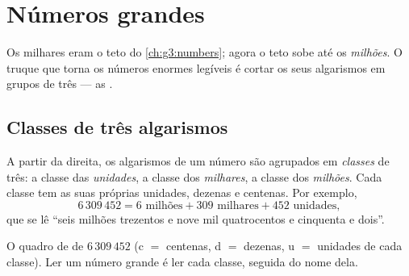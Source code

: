 \chapter{Números grandes}\label{ch:g4:numbers}

Os milhares eram o teto do \cref{ch:g3:numbers}; agora o teto sobe
até os \emph{milhões}. O truque que torna os números enormes legíveis
é cortar os seus algarismos em grupos de três --- as .

\section{Classes de três algarismos}

\begin{definition}[Classes]\label{def:g4:numbers:classes}
A partir da direita, os algarismos de um número são agrupados em
\emph{classes} de três: a classe das \emph{unidades}, a classe dos
\emph{milhares}, a classe dos \emph{milhões}. Cada classe tem as suas
próprias unidades, dezenas e centenas. Por exemplo,
\[
6\,309\,452 = 6 \text{ milhões} + 309 \text{ milhares}
+ 452 \text{ unidades},
\]
que se lê ``seis milhões trezentos e nove mil quatrocentos e
cinquenta e dois''.
\end{definition}

\begin{omfigure}

{\small O quadro de  de $6\,309\,452$ (c $=$ centenas, d $=$
dezenas, u $=$ unidades de cada classe). Ler um número grande é ler
cada classe, seguida do nome dela.}
\end{omfigure}


